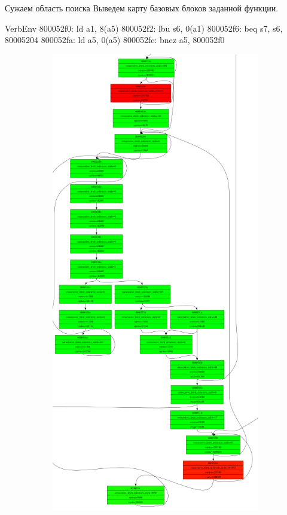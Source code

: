 \documentclass[10pt,aspectratio=169,hyperref={pdftex,unicode},xcolor=dvipsnames]{beamer}
\begin{document}
\begin{frame}[fragile]{ Сужаем область поиска }
    Выведем карту базовых блоков заданной функции.


\begin{SaveVerbatim}[]{VerbEnv}
800052f0:	ld a1, 8(a5)
800052f2:	lbu s6, 0(a1)
800052f6:	beq s7, s6, 80005204
800052fa:	ld a5, 0(a5)
800052fc:	bnez a5, 800052f0
\end{SaveVerbatim}

    \begin{figure}
        \begin{subfigure}{0.45\textwidth}
            \centering
            \includegraphics[height=0.8\textheight,keepaspectratio]{./images/stac_blocks.png}

\end{subfigure}
\end{figure}
\end{frame}
\end{document}
